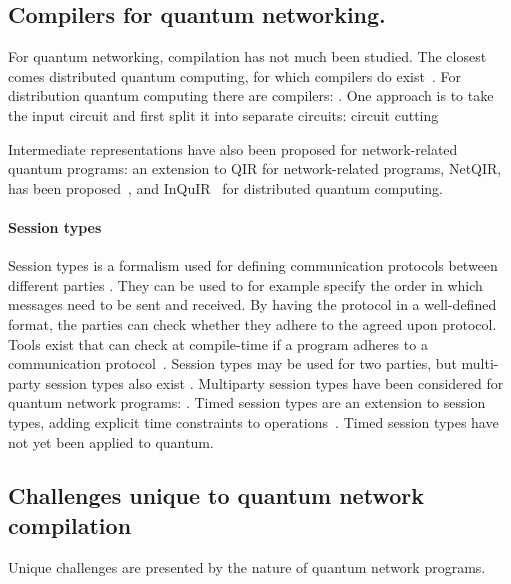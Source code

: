 \subsection{Compilers for quantum networking.}
For quantum networking, compilation has not much been studied.
The closest comes distributed quantum computing, for which compilers do exist~\cite{ferrari_compiler_2021, chatterjee_qurzon_2022, cuomo_optimized_2023, ferrari_modular_2023}.
For distribution quantum computing there are compilers: \cite{ferrari_compiler_2021, haner_distributed_2021, cuomo_optimized_2023, ferrari_modular_2023}.
One approach is to take the input circuit and first split it into separate circuits: circuit cutting~\cite{chatterjee_qurzon_2022}

Intermediate representations have also been proposed for network-related quantum programs:
an extension to QIR for network-related programs, NetQIR, has been proposed~\cite{vazquez-perez_netqir_2024}, and InQuIR~\cite{nishio_inquir_2023} for distributed quantum computing.


\paragraph{Session types}

Session types is a formalism used for defining communication protocols between different parties \cite{honda_language_1998}.
They can be used to for example specify the order in which messages need to be sent and received.
By having the protocol in a well-defined format, the parties can check whether they adhere to the agreed upon protocol.
Tools exist that can check at compile-time if a program adheres to a communication protocol~\cite{davidson_model_nodate, ardeshir-larijani_automated_2018}.
Session types may be used for two parties, but multi-party session types also exist \cite{honda_multiparty_2016}.
Multiparty session types have been considered for quantum network programs: \cite{lanese_towards_2024}.
Timed session types are an extension to session types, adding explicit time constraints to operations~\cite{bartoletti_timed_2017}.
Timed session types have not yet been applied to quantum.


\subsection{Challenges unique to quantum network compilation}
Unique challenges are presented by the nature of quantum network programs.

